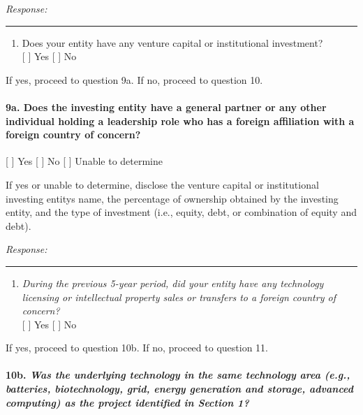 \documentclass[
]{article}
\providecommand{\tightlist}{%
  \setlength{\itemsep}{0pt}\setlength{\parskip}{0pt}}
\begin{document}
\emph{Response:}

\begin{center}\rule{0.5\linewidth}{0.5pt}\end{center}

\begin{enumerate}
\def\labelenumi{\arabic{enumi}.}
\setcounter{enumi}{8}
\tightlist
\item
  Does your entity have any venture capital or institutional
  investment?\\
  {[} {]} Yes {[} {]} No
\end{enumerate}

If yes, proceed to question 9a. If no, proceed to question 10.

\paragraph{9a. Does the investing entity have a general partner or any
other individual holding a leadership role who has a foreign affiliation
with a foreign country of
concern?}\label{9a-does-the-investing-entity-have-a-general-partner-or-any-other-individual-holding-a-leadership-role-who-has-a-foreign-affiliation-with-a-foreign-country-of-concern}

{[} {]} Yes {[} {]} No {[} {]} Unable to determine

If yes or unable to determine, disclose the venture capital or
institutional investing entity\textquotesingle s name, the percentage of
ownership obtained by the investing entity, and the type of investment
(i.e., equity, debt, or combination of equity and debt).

\emph{Response:}

\begin{center}\rule{0.5\linewidth}{0.5pt}\end{center}

\begin{enumerate}
\def\labelenumi{\arabic{enumi}.}
\setcounter{enumi}{9}
\tightlist
\item
  \emph{During the previous 5-year period, did your entity have any
  technology licensing or intellectual property sales or transfers to a
  foreign country of concern?}\\
  {[} {]} Yes {[} {]} No
\end{enumerate}

If yes, proceed to question 10b. If no, proceed to question 11.

\paragraph{\texorpdfstring{10b. \emph{Was the underlying technology in
the same technology area (e.g., batteries, biotechnology, grid, energy
generation and storage, advanced computing) as the project identified in
Section
1?}}{10b. Was the underlying technology in the same technology area (e.g., batteries, biotechnology, grid, energy generation and storage, advanced computing) as the project identified in Section 1?}}\label{10b-was-the-underlying-technology-in-the-same-technology-area-eg-batteries-biotechnology-grid-energy-generation-and-storage-advanced-computing-as-the-project-identified-in-section-1}
\end{document}

